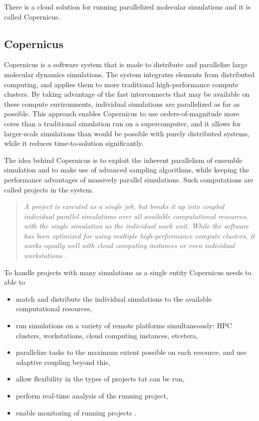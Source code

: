 

There is a cloud solution for running parallelized molecular
simulations and it is called Copernicus.


\subsection{Copernicus}
Copernicus is a software system that is made to distribute and
parallelize large molecular dynamics simulations. The system
integrates elements from distributed computing, and applies them to
more traditional high-performance compute clusters. By taking
advantage of the fast interconnects that may be available on these
compute environments, individual simulations are parallelized as far
as possible. This approach enables Copernicus to use
orders-of-magnitude more cores than a traditional simulation run on a
supercomputer, and it allows for larger-scale simulations than would
be possible with purely distributed systems, while it reduces
time-to-solution significantly.

The idea behind Copernicus is to exploit the inherent parallelism of
ensemble simulation and to make use of advanced sampling algorithms,
while keeping the performance advantages of massively parallel
simulations. Such computations are called projects in the system.

\begin{quote} \slshape
  A project is executed as a single job, but breaks it up into coupled
  individual parallel simulations over all available computational
  resources, with the single simulation as the individual work
  unit. While the software has been optimized for using multiple
  high-performance compute clusters, it works equally well with cloud
  computing instances or even individual
  workstations \citep{pronk:2011}.
\end{quote}

To handle projects with many simulations as a single entity Copernicus
needs to able to
\renewcommand{\labelitemi}{-}
\begin{itemize} \slshape
\item match and distribute the individual simulations to the available
  computational resources,
\item run simulations on a variety of remote platforms simultaneously:
  HPC clusters, workstations, cloud computing instances, etcetera,
\item parallelize tasks to the maximum extent possible on each
  resource, and use adaptive coupling beyond this,
\item allow flexibility in the types of projects tat can be run,
\item perform real-time analysis of the running project,
\item enable monitoring of running projects \citep{pronk:2011}.
\end{itemize}

